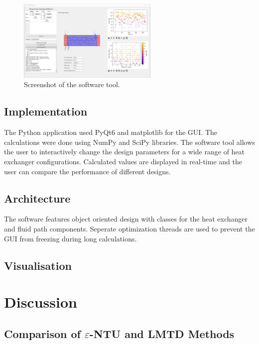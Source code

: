 \documentclass{article}
\begin{document}
\begin{figure}[H]
    \centering
    \includegraphics[width=0.6\textwidth]{software.png}
    \caption{Screenshot of the software tool.}
    \label{fig:software}
\end{figure}

\subsection{Implementation}

The Python application used PyQt6 and matplotlib for the GUI. The calculations were done using NumPy and SciPy libraries.
The software tool allows the user to interactively change the design parameters for a wide range of heat exchanger configurations.
Calculated values are displayed in real-time and the user can compare the performance of different designs.

\subsection{Architecture}
The software features object oriented design with classes for the heat exchanger and fluid path components.
Seperate optimization threads are used to prevent the GUI from freezing during long calculations.

\subsection{Visualisation}

\section{Discussion}

\subsection{Comparison of $\varepsilon$-NTU and LMTD Methods}
\end{document}
